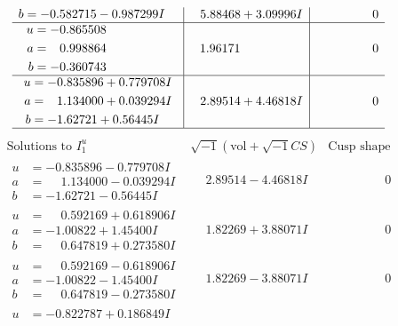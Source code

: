 \documentclass[1p]{elsarticle_modified}
\theoremstyle{definition}
\newcommand{\I}{\sqrt{-1}}
\begin{document}
$$\begin{array}{c|c|c}
\begin{aligned}
b &= -0.582715 - 0.987299 I\end{aligned}
 & \phantom{-}5.88468 + 3.09996 I & \phantom{-0.000000 } 0 \\ \hline\begin{aligned}
u &= -0.865508\phantom{ +0.000000I} \\
a &= \phantom{-}0.998864\phantom{ +0.000000I} \\
b &= -0.360743\phantom{ +0.000000I}\end{aligned}
 & \phantom{-}1.96171\phantom{ +0.000000I} & \phantom{-0.000000 } 0 \\ \hline\begin{aligned}
u &= -0.835896 + 0.779708 I \\
a &= \phantom{-}1.134000 + 0.039294 I \\
b &= -1.62721 + 0.56445 I\end{aligned}
 & \phantom{-}2.89514 + 4.46818 I & \phantom{-0.000000 } 0\\
 \hline 
 \end{array}$$\newpage$$\begin{array}{c|c|c}  
\text{Solutions to }I^u_{1}& \I (\text{vol} + \sqrt{-1}CS) & \text{Cusp shape}\\
 \hline 
\begin{aligned}
u &= -0.835896 - 0.779708 I \\
a &= \phantom{-}1.134000 - 0.039294 I \\
b &= -1.62721 - 0.56445 I\end{aligned}
 & \phantom{-}2.89514 - 4.46818 I & \phantom{-0.000000 } 0 \\ \hline\begin{aligned}
u &= \phantom{-}0.592169 + 0.618906 I \\
a &= -1.00822 + 1.45400 I \\
b &= \phantom{-}0.647819 + 0.273580 I\end{aligned}
 & \phantom{-}1.82269 + 3.88071 I & \phantom{-0.000000 } 0 \\ \hline\begin{aligned}
u &= \phantom{-}0.592169 - 0.618906 I \\
a &= -1.00822 - 1.45400 I \\
b &= \phantom{-}0.647819 - 0.273580 I\end{aligned}
 & \phantom{-}1.82269 - 3.88071 I & \phantom{-0.000000 } 0 \\ \hline\begin{aligned}
u &= -0.822787 + 0.186849 I \\

\end{aligned}
\end{array}$$
\end{document}
